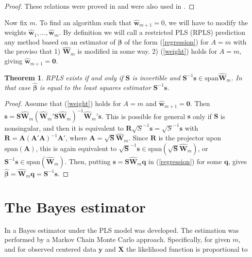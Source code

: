 \documentclass[a4paper, 11pt]{article}
\newtheorem{theorem}{Theorem} \newtheorem{principle}{Principle}
\begin{document}
\begin{proof}
These relations were proved in \citet{helland1988structure} and were also used in \citet{cook2013envelopes}.
\end{proof}

Now fix $m$. To find an algorithm such that $\widehat{\bm{w}}_{m+1}=0$, we will have to modify the weights $\widehat{\bm{w}}_1,...,\widehat{\bm{w}}_m$. By definition we will call a restricted PLS (RPLS) prediction any method based on an estimator of $\bm{\beta}$ of the form (\ref{regression}) for $A=m$ with the proviso that 1) $\widehat{\bm{W}}_{m}$ is modified in some way.  2) (\ref{weight}) holds for $A=m$, giving $\widehat{\bm{w}}_{m+1}=\bm{0}$.

\begin{theorem}
RPLS exists if and only if $\bm{S}$ is invertible and $\bm{S}^{-1}\bm{s}\in\mathrm{span}\widehat{\bm{W}}_{m}$. In that case $\widehat{\bm{\beta}}$ is equal to the least squares estimator $\bm{S}^{-1}\bm{s}$.
\end{theorem}

\begin{proof}
Assume that (\ref{weight}) holds for $A=m$ and $\widehat{\bm{w}}_{m+1}=\bm{0}$. Then $\bm{s}=\bm{S}\widehat{\bm{W}}_m(\widehat{\bm{W}}_m'\bm{S}\widehat{\bm{W}}_m)^{-1}\widehat{\bm{W}}_m'\bm{s}$. This is possible for general $\bm{s}$ only if $\bm{S}$ is nonsingular, and then it is equivalent to $\bm{R}\sqrt{S}^{-1}\bm{s}=\sqrt{S}^{-1}\bm{s}$ with $\bm{R}=\bm{A}(\bm{A}'\bm{A})^{-1}\bm{A}'$, where $\bm{A}=\sqrt{\bm{S}}\widehat{\bm{W}}_m$. Since $\bm{R}$ is the projector upon $\mathrm{span}(\bm{A})$, this is again equivalent to $\sqrt{\bm{S}}^{-1}\bm{s}\in\mathrm{span}(\sqrt{\bm{S}}\widehat{\bm{W}}_m)$, or $\bm{S}^{-1}\bm{s}\in\mathrm{span}(\widehat{\bm{W}}_m)$. Then, putting $\bm{s}=\bm{S}\widehat{\bm{W}}_m\bm{q}$ in (\ref{regression}) for some $\bm{q}$, gives $\widehat{\bm{\beta}}=\widehat{\bm{W}}_m\bm{q}=\bm{S}^{-1}\bm{s}$.
\end{proof}

\section{The Bayes estimator}

In \citet{helland2012near} a Bayes estimator under the PLS model was developed. The estimation was performed by a Markov Chain Monte Carlo approach. Specifically, for given $m$, and for observed centered data $\bm{y}$ and $\bm{X}$ the likelihood function is proportional to
\end{document}
